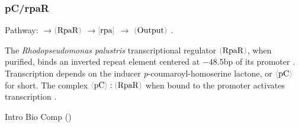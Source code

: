 \documentclass[12pt]{article}
\newcommand{\cbra}[1]{{\color{gray}\ensuremath{#1}}}
\newcommand{\signal}[1]{\ensuremath{\cbra{\langle}\mathrm{#1}\cbra{\rangle}}}
\newcommand{\protein}[1]{\ensuremath{\cbra{(}\mathrm{#1}\cbra{)}}}
\newcommand{\promoter}[1]{\ensuremath{\cbra{[}\mathrm{#1}\cbra{]}}}
\newcommand{\act}{\ensuremath{\to}}
\def\[#1\]{\begin{align}#1\end{align}}
\begin{document}
\subsubsection*{pC/rpaR}

Pathway:
%
\[
	\signal{pC} \act \protein{RpaR} \act \promoter{rpa}
	\act 
	\protein{Output}
	.
\]

The \emph{Rhodopseudomonas palustris} transcriptional regulator
\protein{RpaR},
when purified,
binds an inverted repeat element 
centered at $-48.5$bp
of its promoter
\cite{HirakawaETAL2011}.
%
%
Transcription depends on 
the inducer 
\emph{p}-coumaroyl-homoserine lactone,
or \signal{pC} for short.
%
%
%
%
The complex 
$\signal{pC} : \protein{RpaR}$
when bound to the promoter
activates transcription
\cite[Discussion]{HirakawaETAL2011}.






\footnotesize



\SHOWTODOS

\leavevmode\vfill{\tiny\color{lightgray}\hfill{Intro Bio Comp (\DTMnow)}}
\end{document}
